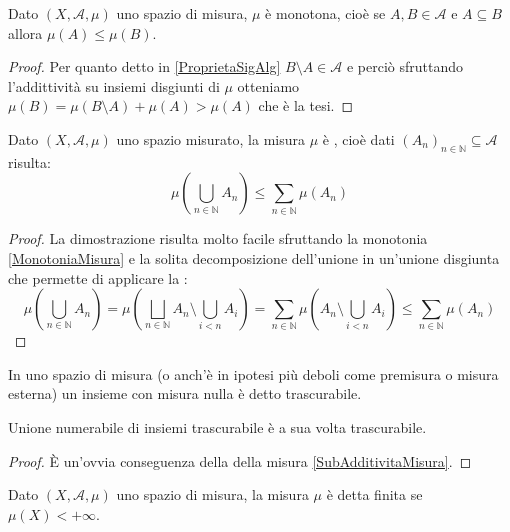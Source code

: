 \begin{remark}\label{MonotoniaMisura}
	Dato $(X,\mathcal A,\mu)$ uno spazio di misura, $\mu$ è monotona, cioè se $A,B\in\mathcal A$ e $A\subseteq B$ allora $\mu(A)\le \mu(B)$.
\end{remark}
\begin{proof}
	Per quanto detto in \cref{ProprietaSigAlg} $B\setminus A\in\mathcal A$ e perciò sfruttando l'addittività su insiemi disgiunti di $\mu$ otteniamo $\mu(B)=\mu(B\setminus A)+\mu(A)>\mu(A)$ che è la tesi.
\end{proof}
\begin{remark}\label{SubAdditivitaMisura}
	Dato $(X,\mathcal A,\mu)$ uno spazio misurato, la misura $\mu$ è \sigsubadd{}, cioè dati $(A_n)_{n\in\mathbb N}\subseteq\mathcal A$ risulta:
	\begin{equation*}
		\mu\left(\bigcup_{n\in\mathbb N} A_n \right)\le \sum_{n\in\mathbb N}\mu(A_n)
	\end{equation*}
\end{remark}
\begin{proof}
	La dimostrazione risulta molto facile sfruttando la monotonia \cref{MonotoniaMisura} e la solita decomposizione dell'unione in un'unione disgiunta che permette di applicare la \sigadd[ità]:
	\begin{equation*}
		\mu\left(\bigcup_{n\in\mathbb N} A_n \right)=\mu\left(\bigsqcup_{n\in\mathbb N} A_n\setminus\bigcup_{i<n}A_i \right)=
		\sum_{n\in\mathbb N}\mu\left(A_n\setminus\bigcup_{i<n}A_i\right)\le \sum_{n\in\mathbb N}\mu(A_n)
	\end{equation*}
\end{proof}



\begin{definition}\label{TrascurabiliMisura}
	In uno spazio di misura (o anch'è in ipotesi più deboli come premisura o misura esterna) un insieme con misura nulla è detto trascurabile.
\end{definition}
\begin{remark}\label{UnioneTrascurabili}
	Unione numerabile di insiemi trascurabile è a sua volta trascurabile.
\end{remark}
\begin{proof}
	È un'ovvia conseguenza della \sigsubadd[ità] della misura \cref{SubAdditivitaMisura}.
\end{proof}




\begin{definition}\label{FinitezzaMisura}
	Dato $(X,\mathcal A,\mu)$ uno spazio di misura, la misura $\mu$ è detta finita se $\mu(X)<+\infty$.
\end{definition}

